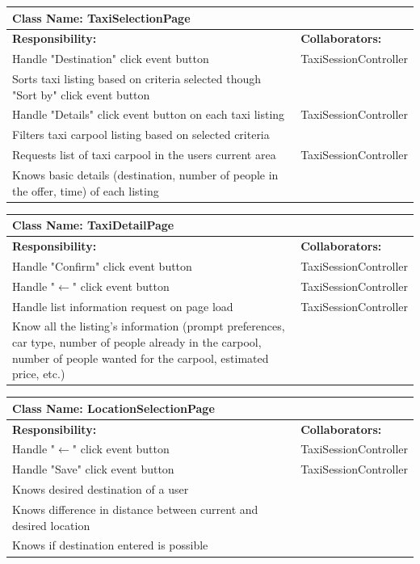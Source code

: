 \documentclass[]{article}
\begin{document}
\begin{table}[H]
\centering
\begin{tabular}{|p{6cm}|p{6cm}|}
\hline 
 \multicolumn{2}{|l|}{\textbf{Class Name: TaxiSelectionPage}} \\
\hline
\textbf{Responsibility:} & \textbf{Collaborators:} \\
\hline
Handle "Destination" click event button & TaxiSessionController \\ \hline
Sorts taxi listing based on criteria selected though "Sort by" click event button & \\ \hline
Handle "Details" click event button on each taxi listing & TaxiSessionController \\ \hline
Filters taxi carpool listing based on selected criteria & \\ \hline
Requests list of taxi carpool in the users current area & TaxiSessionController \\ \hline
Knows basic details (destination, number of people in the offer, time) of each listing & \\ \hline
\end{tabular}
\end{table}

\begin{table}[H]
\centering
\begin{tabular}{|p{6cm}|p{6cm}|}
\hline 
 \multicolumn{2}{|l|}{\textbf{Class Name: TaxiDetailPage}} \\
\hline
\textbf{Responsibility:} & \textbf{Collaborators:} \\
\hline
Handle "Confirm" click event button & TaxiSessionController \\ \hline
Handle "$\xleftarrow{}$" click event button & TaxiSessionController \\ \hline
Handle list information request on page load & TaxiSessionController\\ \hline
Know all the listing's information (prompt preferences, car type, number of people already in the carpool, number of people wanted for the carpool, estimated price, etc.)  & \\ \hline
\end{tabular}
\end{table}

\begin{table}[H]
\centering
\begin{tabular}{|p{6cm}|p{6cm}|}
\hline 
 \multicolumn{2}{|l|}{\textbf{Class Name: LocationSelectionPage}} \\
\hline
\textbf{Responsibility:} & \textbf{Collaborators:} \\
\hline
Handle "$\xleftarrow{}$" click event button & TaxiSessionController \\ \hline
Handle "Save" click event button & TaxiSessionController\\ \hline
Knows desired destination of a user & \\ \hline
Knows difference in distance between current and desired location & \\ \hline
Knows if destination entered is possible & \\ \hline
\end{tabular}
\end{table}
\end{document}
